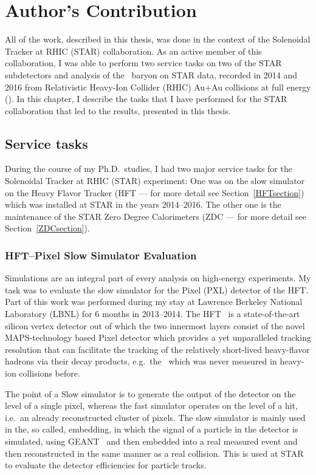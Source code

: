 \chapter*{Author's Contribution}
All of the work, described in this thesis, was done in the context of the Solenoidal Tracker at RHIC (STAR) collaboration. As an active member of this collaboration, I was able to perform two service tasks on two of the STAR subdetectors and analysis of the \Lambdac\ baryon on STAR data, recorded in 2014 and 2016 from Relativistic Heavy-Ion Collider (RHIC) Au+Au collisions at full energy (\snnFull)\@. In this chapter, I describe the tasks that I have performed for the STAR collaboration that led to the results, presented in this thesis.


\section*{Service tasks}
During the course of my Ph.D.\ studies, I had two major service tasks for the Solenoidal Tracker at RHIC (STAR) experiment: One was on the slow simulator on the Heavy Flavor Tracker (HFT --- for more detail see Section~\ref{HFTsection}) which was installed at STAR in the years 2014--2016.  The other one is the maintenance of the STAR Zero Degree Calorimeters (ZDC --- for more detail see Section~\ref{ZDCsection}).

\subsection*{HFT--Pixel Slow Simulator Evaluation}
Simulations are an integral part of every analysis on high-energy experiments. My task was to evaluate the slow simulator for the Pixel (PXL) detector of the HFT\@. Part of this work was performed during my stay at Lawrence Berkeley National Laboratory (LBNL) for 6 months in 2013--2014\@. The HFT~\cite{HFTLeo, HftFinal, HftTdr} is a state-of-the-art silicon vertex detector out of which the two innermost layers consist of the novel MAPS-technology based Pixel detector which provides a yet unparalleled tracking resolution that can facilitate the tracking of the relatively short-lived heavy-flavor hadrons via their decay products, e.g.\ the \Lambdac\ which was never measured in heavy-ion collisions before.

The point of a Slow simulator is to generate the output of the detector on the level of a single pixel, whereas the fast simulator operates on the level of a hit, i.e.\ an already reconstructed cluster of pixels. The slow simulator is mainly used in the, so called, embedding, in which the signal of a particle in the detector is simulated, using GEANT~\cite{GEANT} and then embedded into a real measured event and then reconstructed in the same manner as a real collision.
This is used at STAR to evaluate the detector efficiencies for particle tracks.


